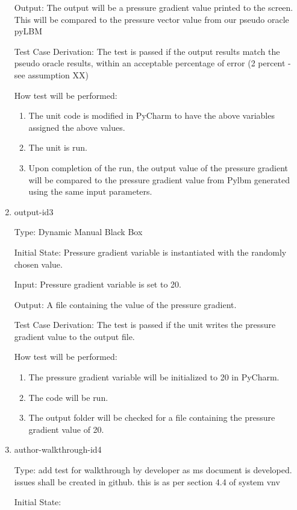 \documentclass[12pt, titlepage]{article}
\begin{document}
\begin{enumerate}
Output: The output will be a pressure gradient value printed to the screen. This will be compared to the pressure vector value from our pseudo oracle pyLBM

Test Case Derivation: The test is passed if the output results match the pseudo oracle results, within an acceptable percentage of error (2 percent - see assumption XX)

How test will be performed: 
\begin{enumerate}
\item The unit code is modified in PyCharm to have the above variables assigned the above values.
\item The unit is run.
\item Upon completion of the run, the output value of the pressure gradient will be compared to the pressure gradient value from Pylbm generated using the same input parameters.
\end{enumerate}

\item{output-id3\\}

Type: Dynamic Manual Black Box
					
Initial State: Pressure gradient variable is instantiated with the randomly chosen value.
					
Input: Pressure gradient variable is set to 20.
					
Output: A file containing the value of the pressure gradient.

Test Case Derivation: The test is passed if the unit writes the pressure gradient value to the output file.

How test will be performed: 
\begin{enumerate}
\item The pressure gradient variable will be initialized to 20 in PyCharm.
\item The code will be run.
\item The output folder will be checked for a file containing the pressure gradient value of 20.
\end{enumerate}

\item{author-walkthrough-id4\\}

Type: add test for walkthrough by developer as ms document is developed. issues shall be created in github. this is as per section 4.4 of system vnv
					
Initial State: 
					

\end{enumerate}
\end{document}
